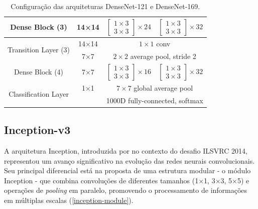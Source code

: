 \begin{table}[h]
\begin{tabular}{|c|c|c|c|}
        \hline
        Dense Block (3) & 14×14 & 
        $\left[\begin{array}{c}
        1 \times 3 \\
        3 \times 3
        \end{array}\right] \times 24$ & 
        $\left[\begin{array}{c}
        1 \times 3 \\
        3 \times 3
        \end{array}\right] \times 32$ \\
        \hline
        \multirow{2}{*}{Transition Layer (3)} & 14×14 & \multicolumn{2}{c|}{$1 \times 1$ conv} \\
        \cline{2-4}
        & 7×7 & \multicolumn{2}{c|}{$2 \times 2$ average pool, stride 2} \\
        \hline
        Dense Block (4) & 7×7 & 
        $\left[\begin{array}{c}
        1 \times 3 \\
        3 \times 3
        \end{array}\right] \times 16$ & 
        $\left[\begin{array}{c}
        1 \times 3 \\
        3 \times 3
        \end{array}\right] \times 32$ \\
        \hline
        \multirow{2}{*}{Classification Layer} & 1×1 & \multicolumn{2}{c|}{$7 \times 7$ global average pool} \\
        \cline{2-4}
        &  & \multicolumn{2}{c|}{1000D fully-connected, softmax} \\
        \hline
    \end{tabular}
    \caption{Configuração das arquiteturas DenseNet-121 e DenseNet-169.}
    \label{densenet-arch}
\end{table}

\subsection{Inception-v3}

A arquitetura Inception, introduzida por \cite{Szegedy2015} no contexto do desafio ILSVRC 2014, representou um avanço significativo na evolução das redes neurais convolucionais. Seu principal diferencial está na proposta de uma estrutura modular - o módulo Inception - que combina convoluções de diferentes tamanhos (1×1, 3×3, 5×5) e operações de \textit{pooling} em paralelo, promovendo o processamento de informações em múltiplas escalas (\autoref{inception-module}).

